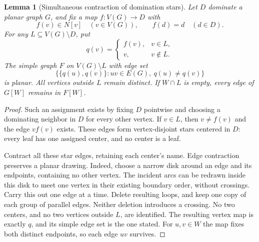 \documentclass[11pt,a4paper]{article}
\newtheorem{lemma}[lemma]{Lemma}
\theoremstyle{definition}
\theoremstyle{remark}
\begin{document}
\begin{lemma}[Simultaneous contraction of domination stars]
\label{geom:star-contraction}
Let $D$ dominate a planar graph $G$, and fix a map $f:V(G)\to D$ with
\[
 f(v)\in N[v]\quad(v\in V(G)),\qquad f(d)=d\quad(d\in D).
\]
For any $L\subseteq V(G)\setminus D$, put
\[
 q(v)=
 \begin{cases} f(v),&v\in L,\\ v,&v\notin L.\end{cases}
\]
The simple graph $F$ on $V(G)\setminus L$ with edge set
\[
 \bigl\{\{q(u),q(v)\}:uv\in E(G),\ q(u)\ne q(v)\bigr\}
\]
is planar. All vertices outside $L$ remain distinct. If $W\cap L$ is
empty, every edge of $G[W]$ remains in $F[W]$.
\end{lemma}
\begin{proof}
Such an assignment exists by fixing $D$ pointwise and choosing a dominating
neighbor in $D$ for every other vertex. If $v\in L$, then $v\ne f(v)$ and
the edge $vf(v)$ exists. These edges form vertex-disjoint stars centered
in $D$: every leaf has one assigned center, and no center is a leaf.

Contract all these star edges, retaining each center's name. Edge
contraction preserves a planar drawing. Indeed, choose a narrow disk
around an edge and its endpoints, containing no other vertex. The
incident arcs can be redrawn inside this disk to meet one vertex in their
existing boundary order, without crossings. Carry this out one edge at
a time. Delete resulting loops, and keep one copy of each group of
parallel edges. Neither deletion introduces a crossing. No two centers,
and no two vertices outside $L$, are identified. The resulting vertex
map is exactly $q$, and its simple edge set is the one stated.
For $u,v\in W$ the map fixes both distinct endpoints, so each edge $uv$
survives.
\end{proof}
\end{document}
